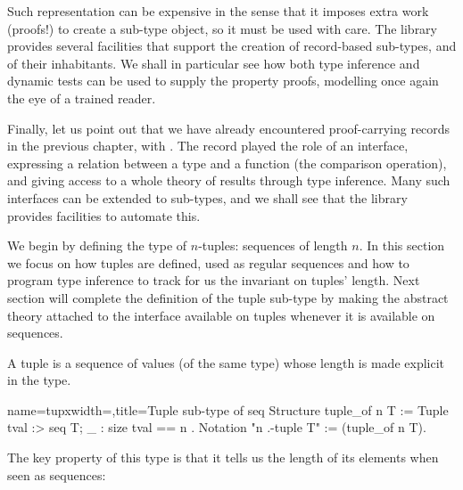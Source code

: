 Such representation can be expensive in the sense that it imposes
extra work (proofs!) to create a sub-type object, so it must be used
with care.  The \mcbMC{} library provides several facilities that
support the creation of record-based sub-types, and of their
inhabitants.  We shall in particular see how both type inference and
dynamic tests can be used to supply the property proofs, modelling
once again the eye of a trained reader.

Finally, let us point out that we have already encountered proof-carrying
records in the previous chapter, with .
The  record played the role of an interface,
expressing a relation between a type and a function (the comparison operation),
and giving access to a whole theory of results through type inference.
Many such interfaces can be extended to sub-types, and we shall see that
the \mcbMC{} library provides facilities to automate this.

\mcbLEARN{}
\mcbNOTES{}
\label{sec:tupleinvariant}

We begin by defining the type of $n$-tuples: sequences of length $n$.
In this section we focus on how tuples are defined, used as regular
sequences and how to program type inference to track for us the
invariant on tuples' length.  Next section will complete the
definition of the tuple sub-type by making the abstract theory
attached to the  interface available on tuples whenever it is
available on sequences.

A tuple is a sequence of values (of the same type) whose length is
made explicit in the type.

\begin{coq}{name=tupx}{width=\textwidth,title=Tuple sub-type of seq}
Structure tuple_of n T :=  Tuple { tval :> seq T; _ : size tval == n }.
Notation "n .-tuple T" := (tuple_of n T).
\end{coq}


The key property of this type is that it tells us the length of its
elements when seen as sequences:

